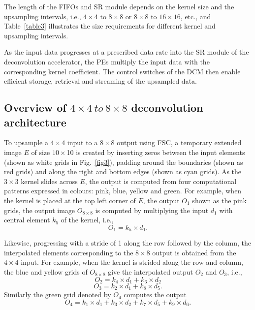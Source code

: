 \documentclass[journal]{IEEEtran}
\begin{document}
The length of the FIFOs and SR module  depends on the kernel size and the upsampling intervals, i.e., $4\times4$ to $8\times8$ or $8\times8$ to $16\times16$, etc., and Table~\ref{table3} illustrates the size requirements for different kernel and upsampling intervals.


As the input data progresses at a prescribed data rate into the SR module of the deconvolution accelerator, the PEs multiply the input data with the corresponding kernel coefficient. The control switches of the DCM then enable efficient storage, retrieval and streaming of the upsampled data.

\subsection{Overview of $4\times4 \ to \ 8\times8$ deconvolution architecture }

To upsample a $4\times4$ input to a $8\times8$ output using FSC, a temporary extended image $E$ of size $10\times$10 is created by inserting zeros between the input elements (shown as white grids in Fig.~\ref{fig3}), padding around the boundaries (shown as red grids) and along the right and bottom edges (shown as cyan grids). As the $3 \times 3$ kernel slides across $E$, the output is computed from  four computational patterns expressed in colours: pink, blue, yellow and green. For example, when the kernel is placed at the top left corner of $E$, the output $O_1$ shown as the pink grids, the output image $O_{8 \times 8}$ is computed by multiplying the input $d_1$ with central element $k_5$ of the kernel, i.e.,
\begin{equation}O_1 = k_5 \times d_1. \end{equation}

Likewise, progressing with a stride of 1 along the row followed by the column, the interpolated elements corresponding to the $8\times8$ output is obtained from the $4\times4$ input. For example, when the kernel is strided along the row and column, the blue  and  yellow grids of $O_{8 \times 8}$  give the interpolated output $O_2$ and $O_3$, i.e.,
 \begin{equation}O_2 = k_4 \times d_1 + k_6 \times d_2 \end{equation} 
 \begin{equation}O_3 = k_2 \times d_1 + k_8 \times d_5.\end{equation}
Similarly the green grid denoted by $O_4$ computes the output 
 \begin{equation}O_4 = k_1 \times d_1 + k_3 \times d_2 + k_7 \times d_5 + k_9 \times d_6.\end{equation}
\end{document}

